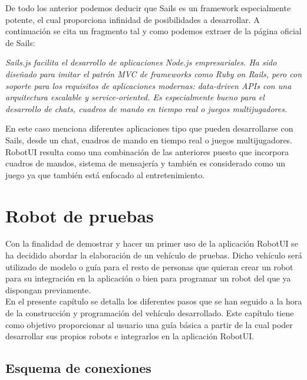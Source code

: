 \documentclass[a4paper,12pt]{article}
\begin{document}
De todo los anterior podemos deducir que Sails es un framework especialmente potente, el cual proporciona infinidad de posibilidades a desarrollar. A continuación se cita un fragmento tal y 
como podemos extraer de la página oficial de Sails:\\

\begin{center}
\emph{Sails.js facilita el desarrollo de aplicaciones Node.js empresariales. Ha sido diseñado para imitar el patrón MVC de frameworks como Ruby on Rails, pero con soporte para los requisitos de aplicaciones modernas: data-driven APIs con una arquitectura escalable y service-oriented. Es especialmente bueno para el desarrollo de chats, cuadros de mando en tiempo real o juegos
multijugadores.} 
\end{center}

En este caso menciona diferentes aplicaciones tipo que pueden desarrollarse con Sails, desde un chat, cuadros de mando en tiempo real o juegos multijugadores. RobotUI resulta como una combinación de las 
anteriores puesto que incorpora cuadros de mandos, sistema de mensajería y también es considerado como un juego ya que también está enfocado al entretenimiento.\\


\section{Robot de pruebas}

Con la finalidad de demostrar y hacer un primer uso de la aplicación RobotUI se ha decidido abordar la elaboración de un vehículo de pruebas. Dicho vehículo será utilizado de modelo o guía para el 
resto de personas que quieran crear un robot para su integración en la aplicación o bien para programar un robot del que ya dispongan previamente.\\

En el presente capítulo se detalla los diferentes pasos que se han seguido a la hora de la construcción y programación del vehículo desarrollado. Este capítulo tiene como objetivo proporcionar al usuario
una guía básica a partir de la cual poder desarrollar sus propios robots e integrarlos en la aplicación RobotUI.\\


\subsection{Esquema de conexiones}
\end{document}
